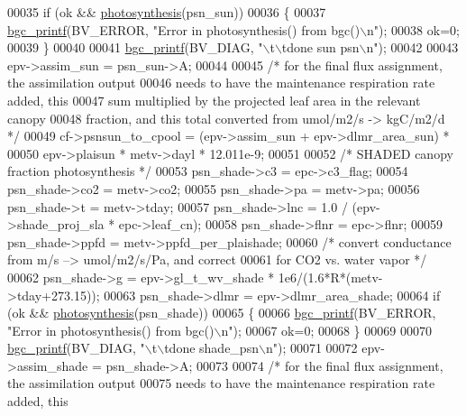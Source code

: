 \begin{DoxyCode}
00035     \textcolor{keywordflow}{if} (ok && \hyperlink{photosynthesis_8c_a7694972f8a6aaea60ca6d5506d705060}{photosynthesis}(psn\_sun))
00036     \{
00037         \hyperlink{bgc__io_8c_af287cce6e2aede1ce337de9319e80d0d}{bgc\_printf}(BV\_ERROR, \textcolor{stringliteral}{"Error in photosynthesis() from bgc()\(\backslash\)n"});
00038         ok=0;
00039     \}
00040 
00041     \hyperlink{bgc__io_8c_af287cce6e2aede1ce337de9319e80d0d}{bgc\_printf}(BV\_DIAG, \textcolor{stringliteral}{"\(\backslash\)t\(\backslash\)tdone sun psn\(\backslash\)n"});
00042 
00043     epv->assim\_sun = psn\_sun->A;
00044 
00045     \textcolor{comment}{/* for the final flux assignment, the assimilation output}
00046 \textcolor{comment}{        needs to have the maintenance respiration rate added, this}
00047 \textcolor{comment}{        sum multiplied by the projected leaf area in the relevant canopy}
00048 \textcolor{comment}{        fraction, and this total converted from umol/m2/s -> kgC/m2/d */}
00049     cf->psnsun\_to\_cpool = (epv->assim\_sun + epv->dlmr\_area\_sun) *
00050         epv->plaisun * metv->dayl * 12.011e-9;
00051 
00052     \textcolor{comment}{/* SHADED canopy fraction photosynthesis */}
00053     psn\_shade->c3 = epc->c3\_flag;
00054     psn\_shade->co2 = metv->co2;
00055     psn\_shade->pa = metv->pa;
00056     psn\_shade->t = metv->tday;
00057     psn\_shade->lnc = 1.0 / (epv->shade\_proj\_sla * epc->leaf\_cn);
00058     psn\_shade->flnr = epc->flnr;
00059     psn\_shade->ppfd = metv->ppfd\_per\_plaishade;
00060     \textcolor{comment}{/* convert conductance from m/s --> umol/m2/s/Pa, and correct}
00061 \textcolor{comment}{    for CO2 vs. water vapor */}
00062     psn\_shade->g = epv->gl\_t\_wv\_shade * 1e6/(1.6*R*(metv->tday+273.15));
00063     psn\_shade->dlmr = epv->dlmr\_area\_shade;
00064     \textcolor{keywordflow}{if} (ok && \hyperlink{photosynthesis_8c_a7694972f8a6aaea60ca6d5506d705060}{photosynthesis}(psn\_shade))
00065     \{
00066         \hyperlink{bgc__io_8c_af287cce6e2aede1ce337de9319e80d0d}{bgc\_printf}(BV\_ERROR, \textcolor{stringliteral}{"Error in photosynthesis() from bgc()\(\backslash\)n"});
00067         ok=0;
00068     \}
00069 
00070     \hyperlink{bgc__io_8c_af287cce6e2aede1ce337de9319e80d0d}{bgc\_printf}(BV\_DIAG, \textcolor{stringliteral}{"\(\backslash\)t\(\backslash\)tdone shade\_psn\(\backslash\)n"});
00071 
00072     epv->assim\_shade = psn\_shade->A;
00073 
00074     \textcolor{comment}{/* for the final flux assignment, the assimilation output}
00075 \textcolor{comment}{        needs to have the maintenance respiration rate added, this}

\end{DoxyCode}
